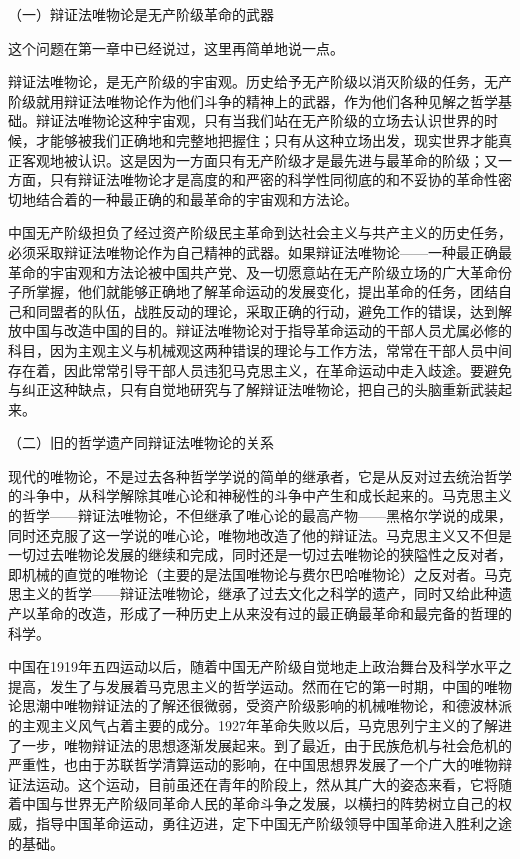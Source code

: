 \documentclass[UTF8, 12pt, a4paper]{ctexrep}
\begin{document}
（一）辩证法唯物论是无产阶级革命的武器

这个问题在第一章中已经说过，这里再简单地说一点。

辩证法唯物论，是无产阶级的宇宙观。历史给予无产阶级以消灭阶级的任务，无产阶级就用辩证法唯物论作为他们斗争的精神上的武器，作为他们各种见解之哲学基础。辩证法唯物论这种宇宙观，只有当我们站在无产阶级的立场去认识世界的时候，才能够被我们正确地和完整地把握住；只有从这种立场出发，现实世界才能真正客观地被认识。这是因为一方面只有无产阶级才是最先进与最革命的阶级；又一方面，只有辩证法唯物论才是高度的和严密的科学性同彻底的和不妥协的革命性密切地结合着的一种最正确的和最革命的宇宙观和方法论。

中国无产阶级担负了经过资产阶级民主革命到达社会主义与共产主义的历史任务，必须采取辩证法唯物论作为自己精神的武器。如果辩证法唯物论——一种最正确最革命的宇宙观和方法论被中国共产党、及一切愿意站在无产阶级立场的广大革命份子所掌握，他们就能够正确地了解革命运动的发展变化，提出革命的任务，团结自己和同盟者的队伍，战胜反动的理论，采取正确的行动，避免工作的错误，达到解放中国与改造中国的目的。辩证法唯物论对于指导革命运动的干部人员尤属必修的科目，因为主观主义与机械观这两种错误的理论与工作方法，常常在干部人员中间存在着，因此常常引导干部人员违犯马克思主义，在革命运动中走入歧途。要避免与纠正这种缺点，只有自觉地研究与了解辩证法唯物论，把自己的头脑重新武装起来。

（二）旧的哲学遗产同辩证法唯物论的关系

现代的唯物论，不是过去各种哲学学说的简单的继承者，它是从反对过去统治哲学的斗争中，从科学解除其唯心论和神秘性的斗争中产生和成长起来的。马克思主义的哲学——辩证法唯物论，不但继承了唯心论的最高产物——黑格尔学说的成果，同时还克服了这一学说的唯心论，唯物地改造了他的辩证法。马克思主义又不但是一切过去唯物论发展的继续和完成，同时还是一切过去唯物论的狭隘性之反对者，即机械的直觉的唯物论（主要的是法国唯物论与费尔巴哈唯物论）之反对者。马克思主义的哲学——辩证法唯物论，继承了过去文化之科学的遗产，同时又给此种遗产以革命的改造，形成了一种历史上从来没有过的最正确最革命和最完备的哲理的科学。

中国在1919年五四运动以后，随着中国无产阶级自觉地走上政治舞台及科学水平之提高，发生了与发展着马克思主义的哲学运动。然而在它的第一时期，中国的唯物论思潮中唯物辩证法的了解还很微弱，受资产阶级影响的机械唯物论，和德波林派的主观主义风气占着主要的成分。1927年革命失败以后，马克思列宁主义的了解进了一步，唯物辩证法的思想逐渐发展起来。到了最近，由于民族危机与社会危机的严重性，也由于苏联哲学清算运动的影响，在中国思想界发展了一个广大的唯物辩证法运动。这个运动，目前虽还在青年的阶段上，然从其广大的姿态来看，它将随着中国与世界无产阶级同革命人民的革命斗争之发展，以横扫的阵势树立自己的权威，指导中国革命运动，勇往迈进，定下中国无产阶级领导中国革命进入胜利之途的基础。
\end{document}
